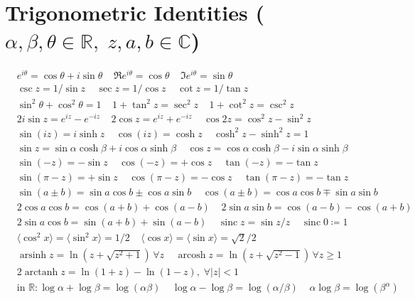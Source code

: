 \section*{Trigonometric Identities \normalfont\scriptsize{($\alpha,\beta,\theta\in\mathbb{R},\; z,a,b\in\mathbb{C}$)}}
\begin{align*}
&e^{i\theta}=\cos\theta+i\sin\theta \;\;\;\; \Re e^{i\theta}=\cos\theta \;\; \;\; \Im e^{i\theta}=\sin\theta \\
&\csc z=1/\sin z \;\; \;\; \sec z=1/\cos z \;\; \;\; \cot z=1/\tan z \\
&\sin^2\theta+\cos^2\theta=1 \;\; \;\; 1+\tan^2 z=\sec^2 z \;\; \;\; 1+\cot^2z=\csc^2z \\
&2i\sin z=e^{iz}-e^{-iz} \;\; \;\; 2\cos z=e^{iz}+e^{-iz} \;\;  \;\;\cos2z=\cos^2 z-\sin^2 z \\
&\sin(iz)=i\sinh z \;\; \;\; \cos(iz)=\cosh z \;\;  \;\;\cosh^2z-\sinh^2z=1 \\
&\sin z=\sin\alpha\cosh\beta+i\cos\alpha\sinh\beta \;\;\;\;\cos z=\cos\alpha\cosh\beta-i\sin\alpha\sinh\beta \\
&\sin(-z)=-\sin z \;\; \;\; \cos(-z)=+\cos z \;\;  \;\; \tan(-z)=-\tan z \\
&\sin(\pi-z)=+\sin z \;\;  \;\;\cos(\pi-z)=-\cos z \;\;  \;\; \tan(\pi-z)=-\tan z \\
&\sin(a\pm b)=\sin a\cos b\pm\cos a\sin b \;\;  \;\;\cos(a\pm b)=\cos a\cos b\mp\sin a\sin b \\
&2\cos a\cos b=\cos(a+b)+\cos(a-b)  \;\; \;\; 2\sin a\sin b=\cos(a-b)-\cos(a+b) \\
&2\sin a\cos b=\sin(a+b)+\sin(a-b) \;\;  \;\;\operatorname{sinc}z=\sin z/z \;\;  \;\;\operatorname{sinc}0\coloneqq1 \\
&\langle\cos^2 x\rangle=\langle\sin^2 x\rangle=1/2 \;\; \;\; \langle\cos x\rangle=\langle\sin x\rangle=\sqrt{2}/2 \\
&\operatorname{arsinh}z=\ln(z+\sqrt{z^2+1})\, \forall z \;\;  \;\;\operatorname{arcosh}z=\ln(z+\sqrt{z^2-1})\, \forall z\geq1 \\
&2\operatorname{arctanh}z=\ln(1+z)-\ln(1-z),\; \forall |z|<1 \\
&\text{in } \mathbb{R}: \log \alpha+\log \beta=\log(\alpha\beta) \;\; \;\; \log \alpha-\log \beta=\log(\alpha/\beta) \;\;  \;\; \alpha\log \beta=\log(\beta^\alpha)  
\end{align*}

